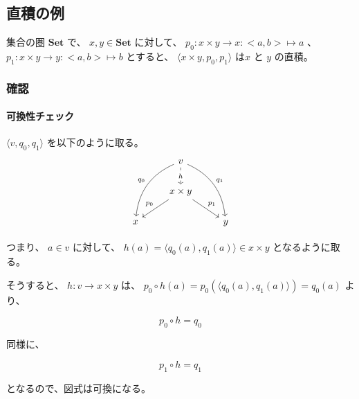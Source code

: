\documentclass[uplatex,a4j,12pt,dvipdfmx]{jsarticle}
\begin{document}
\subsection{直積の例}

集合の圏 $\mathbf{Set}$ で、
$x,y \in \textbf{Set}$ に対して、
$p_{0}:x \times y \to x:<a,b> \mapsto a$
、
$p_{1}:x \times y \to y:<a,b> \mapsto b$
とすると、
$\langle x \times y,p_{0},p_{1} \rangle$
は$x$ と $y$ の直積。



\subsubsection{確認}

\paragraph{可換性チェック}

$\langle v ,q_{0},q_{1} \rangle$
を以下のように取る。
\[
	\begin{tikzcd}
		& v \arrow[ldd, "q_{0}"', bend right] \arrow[rdd, "q_{1}", bend left] \arrow[d, "h" description, dashed] &   \\
		& x \times y \arrow[ld, "p_{0}"'] \arrow[rd, "p_{1}"]                                                                &   \\
		x &                                                                                                                    & y
	\end{tikzcd}
\]

つまり、
$a \in v$ に対して、 $h(a) = \langle q_{0}(a) , q_{1}(a) \rangle \in x \times y$ となるように取る。

そうすると、
$h : v \to x \times y$
は、
$p_{0} \circ h(a) = p_{0} (\langle q_{0}(a) , q_{1}(a) \rangle) = q_{0}(a)$
より、

$$p_{0} \circ h = q_{0}$$

同様に、

$$p_{1} \circ h = q_{1}$$

となるので、図式は可換になる。
\end{document}
